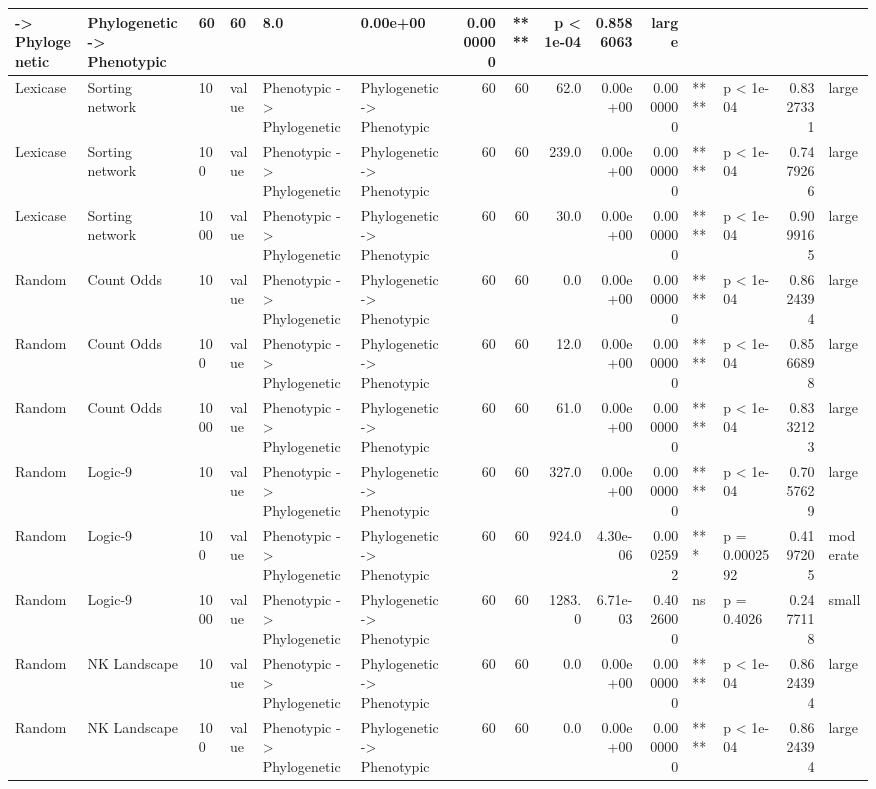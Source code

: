 \documentclass[]{book}
\begin{document}
\begin{table}
\begin{tabular}[t]{l|l|l|l|l|l|r|r|r|r|r|l|l|r|l}
    ->
Phylogenetic & Phylogenetic
    ->
Phenotypic & 60 & 60 & 8.0 & 0.00e+00 & 0.0000000 & **** & p < 1e-04 & 0.8586063 & large\\
\hline
Lexicase & Sorting network & 10 & value & Phenotypic
    ->
Phylogenetic & Phylogenetic
    ->
Phenotypic & 60 & 60 & 62.0 & 0.00e+00 & 0.0000000 & **** & p < 1e-04 & 0.8327331 & large\\
\hline
Lexicase & Sorting network & 100 & value & Phenotypic
    ->
Phylogenetic & Phylogenetic
    ->
Phenotypic & 60 & 60 & 239.0 & 0.00e+00 & 0.0000000 & **** & p < 1e-04 & 0.7479266 & large\\
\hline
Lexicase & Sorting network & 1000 & value & Phenotypic
    ->
Phylogenetic & Phylogenetic
    ->
Phenotypic & 60 & 60 & 30.0 & 0.00e+00 & 0.0000000 & **** & p < 1e-04 & 0.9099165 & large\\
\hline
Random & Count Odds & 10 & value & Phenotypic
    ->
Phylogenetic & Phylogenetic
    ->
Phenotypic & 60 & 60 & 0.0 & 0.00e+00 & 0.0000000 & **** & p < 1e-04 & 0.8624394 & large\\
\hline
Random & Count Odds & 100 & value & Phenotypic
    ->
Phylogenetic & Phylogenetic
    ->
Phenotypic & 60 & 60 & 12.0 & 0.00e+00 & 0.0000000 & **** & p < 1e-04 & 0.8566898 & large\\
\hline
Random & Count Odds & 1000 & value & Phenotypic
    ->
Phylogenetic & Phylogenetic
    ->
Phenotypic & 60 & 60 & 61.0 & 0.00e+00 & 0.0000000 & **** & p < 1e-04 & 0.8332123 & large\\
\hline
Random & Logic-9 & 10 & value & Phenotypic
    ->
Phylogenetic & Phylogenetic
    ->
Phenotypic & 60 & 60 & 327.0 & 0.00e+00 & 0.0000000 & **** & p < 1e-04 & 0.7057629 & large\\
\hline
Random & Logic-9 & 100 & value & Phenotypic
    ->
Phylogenetic & Phylogenetic
    ->
Phenotypic & 60 & 60 & 924.0 & 4.30e-06 & 0.0002592 & *** & p = 0.0002592 & 0.4197205 & moderate\\
\hline
Random & Logic-9 & 1000 & value & Phenotypic
    ->
Phylogenetic & Phylogenetic
    ->
Phenotypic & 60 & 60 & 1283.0 & 6.71e-03 & 0.4026000 & ns & p = 0.4026 & 0.2477118 & small\\
\hline
Random & NK Landscape & 10 & value & Phenotypic
    ->
Phylogenetic & Phylogenetic
    ->
Phenotypic & 60 & 60 & 0.0 & 0.00e+00 & 0.0000000 & **** & p < 1e-04 & 0.8624394 & large\\
\hline
Random & NK Landscape & 100 & value & Phenotypic
    ->
Phylogenetic & Phylogenetic
    ->
Phenotypic & 60 & 60 & 0.0 & 0.00e+00 & 0.0000000 & **** & p < 1e-04 & 0.8624394 & large\\

\end{tabular}
\end{table}
\end{document}
